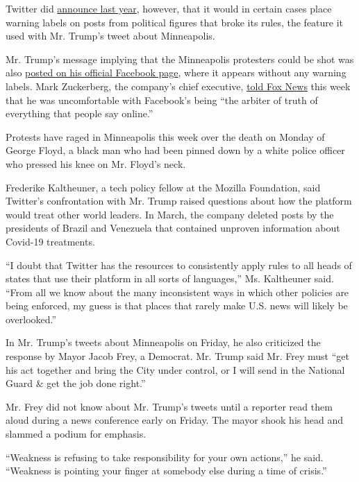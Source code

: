 Twitter did
\href{https://www.nytimes.com/2019/06/27/technology/twitter-politicans-labels-abuse.html}{announce
last year}, however, that it would in certain cases place warning labels
on posts from political figures that broke its rules, the feature it
used with Mr. Trump's tweet about Minneapolis.

Mr. Trump's message implying that the Minneapolis protesters could be
shot was also
\href{https://www.facebook.com/DonaldTrump/posts/10164767134275725}{posted
on his official Facebook page}, where it appears without any warning
labels. Mark Zuckerberg, the company's chief executive,
\href{https://www.foxnews.com/media/facebook-mark-zuckerberg-twitter-fact-checking-trump}{told
Fox News} this week that he was uncomfortable with Facebook's being
``the arbiter of truth of everything that people say online.''

Protests have raged in Minneapolis this week over the death on Monday of
George Floyd, a black man who had been pinned down by a white police
officer who pressed his knee on Mr. Floyd's neck.

Frederike Kaltheuner, a tech policy fellow at the Mozilla Foundation,
said Twitter's confrontation with Mr. Trump raised questions about how
the platform would treat other world leaders. In March, the company
deleted posts by the presidents of Brazil and Venezuela that contained
unproven information about Covid-19 treatments.

``I doubt that Twitter has the resources to consistently apply rules to
all heads of states that use their platform in all sorts of languages,''
Ms. Kaltheuner said. ``From all we know about the many inconsistent ways
in which other policies are being enforced, my guess is that places that
rarely make U.S. news will likely be overlooked.''

In Mr. Trump's tweets about Minneapolis on Friday, he also criticized
the response by Mayor Jacob Frey, a Democrat. Mr. Trump said Mr. Frey
must ``get his act together and bring the City under control, or I will
send in the National Guard \& get the job done right.''

Mr. Frey did not know about Mr. Trump's tweets until a reporter read
them aloud during a news conference early on Friday. The mayor shook his
head and slammed a podium for emphasis.

``Weakness is refusing to take responsibility for your own actions,'' he
said. ``Weakness is pointing your finger at somebody else during a time
of crisis.''

